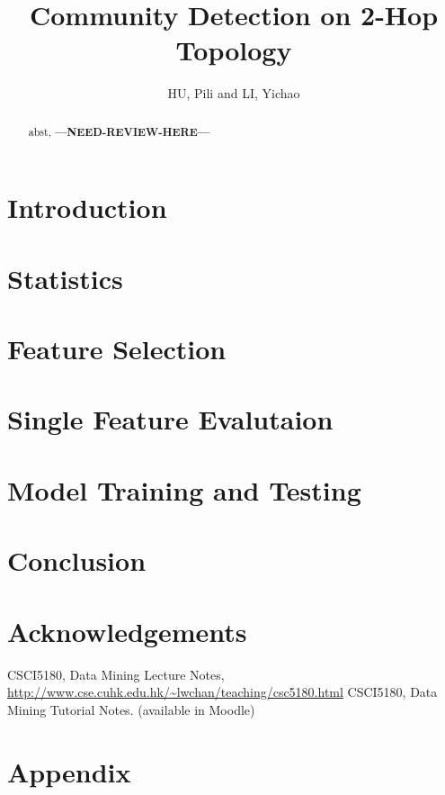 \documentclass[11pt,a4paper]{article}
\author{HU, Pili and LI, Yichao}
\title{Community Detection on 2-Hop Topology}
\newcommand{\question}{\textbf{---NEED-REVIEW-HERE---}}
\begin{document}
\maketitle

\begin{abstract}
	abst, \question
\end{abstract}

\pagebreak
\tableofcontents
\pagebreak

\section{Introduction}

\section{Statistics}

\section{Feature Selection}


\section{Single Feature Evalutaion}


\section{Model Training and Testing}


\section{Conclusion}


\section*{Acknowledgements}

\begin{thebibliography}{99}
	 CSCI5180, Data Mining Lecture Notes, 
		\url{http://www.cse.cuhk.edu.hk/~lwchan/teaching/csc5180.html}
	 CSCI5180, Data Mining Tutorial Notes. 
		(available in Moodle)
\end{thebibliography}


\section*{Appendix}
\end{document}
